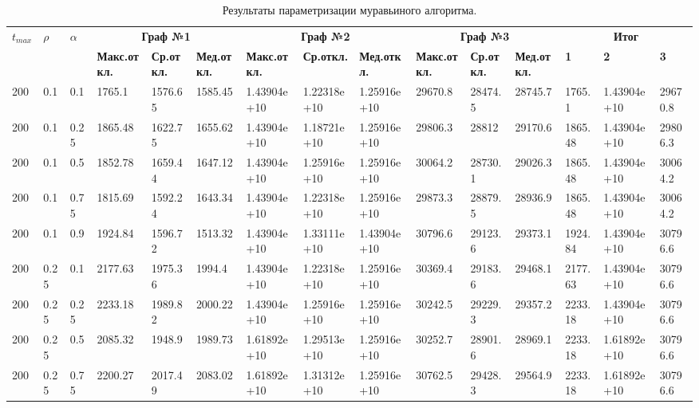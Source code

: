 
\begin{table}[!htbp]
	\tiny
	\caption{Результаты параметризации муравьиного алгоритма.}
	\label{par_table}
	\begin{tabularx}{\textwidth}{|p{0.4cm}|*{2}{p{0.2cm}|}*{12}{X|}}
		\hline
		\multirow{2}{3cm}{$t_{max}$} & 
		\multirow{2}{3cm}{$\rho$} & 
		\multirow{2}{3cm}{$\alpha$} & 
		\multicolumn{3}{c|}{\textbf{Граф №1}} & 
		\multicolumn{3}{c|}{\textbf{Граф №2}} & 
		\multicolumn{3}{c|}{\textbf{Граф №3}} & 
		\multicolumn{3}{c|}{\textbf{Итог}}
		\\\cline{4-15}
		& & & 
		\textbf{Макс.откл.} & \textbf{Ср.откл.} & \textbf{Мед.откл.} & 
		\textbf{Макс.откл.} & \textbf{Ср.откл.} & \textbf{Мед.откл.} & 
		\textbf{Макс.откл.} & \textbf{Ср.откл.} & \textbf{Мед.откл.} & 
		\textbf{1} & \textbf{2} & \textbf{3} 
		\\\hline
200&0.1&0.1&1765.1&1576.65&1585.45&1.43904e+10&1.22318e+10&1.25916e+10&29670.8&28474.5&28745.7&1765.1&1.43904e+10&29670.8\\\hline
200&0.1&0.25&1865.48&1622.75&1655.62&1.43904e+10&1.18721e+10&1.25916e+10&29806.3&28812&29170.6&1865.48&1.43904e+10&29806.3\\\hline
200&0.1&0.5&1852.78&1659.44&1647.12&1.43904e+10&1.25916e+10&1.25916e+10&30064.2&28730.1&29026.3&1865.48&1.43904e+10&30064.2\\\hline
200&0.1&0.75&1815.69&1592.24&1643.34&1.43904e+10&1.22318e+10&1.25916e+10&29873.3&28879.5&28936.9&1865.48&1.43904e+10&30064.2\\\hline
200&0.1&0.9&1924.84&1596.72&1513.32&1.43904e+10&1.33111e+10&1.43904e+10&30796.6&29123.6&29373.1&1924.84&1.43904e+10&30796.6\\\hline
200&0.25&0.1&2177.63&1975.36&1994.4&1.43904e+10&1.22318e+10&1.25916e+10&30369.4&29183.6&29468.1&2177.63&1.43904e+10&30796.6\\\hline
200&0.25&0.25&2233.18&1989.82&2000.22&1.43904e+10&1.25916e+10&1.25916e+10&30242.5&29229.3&29357.2&2233.18&1.43904e+10&30796.6\\\hline
200&0.25&0.5&2085.32&1948.9&1989.73&1.61892e+10&1.29513e+10&1.25916e+10&30252.7&28901.6&28969.1&2233.18&1.61892e+10&30796.6\\\hline
200&0.25&0.75&2200.27&2017.49&2083.02&1.61892e+10&1.31312e+10&1.25916e+10&30762.5&29428.3&29564.9&2233.18&1.61892e+10&30796.6\\\hline

\end{tabularx}
\end{table}

